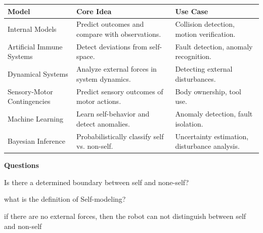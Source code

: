 \documentclass{book}
\providecommand{\ProjectDeepHeading}[2]{%
    \par\medskip\noindent\textbf{#2}\par\smallskip
}
\begin{document}
\begin{tabular}{|l|p{6cm}|p{5cm}|}
    \hline
    \textbf{Model}              & \textbf{Core Idea}                              & \textbf{Use Case}                             \\ \hline
    Internal Models             & Predict outcomes and compare with observations. & Collision detection, motion verification.     \\ \hline
    Artificial Immune Systems   & Detect deviations from self-space.              & Fault detection, anomaly recognition.         \\ \hline
    Dynamical Systems           & Analyze external forces in system dynamics.     & Detecting external disturbances.              \\ \hline
    Sensory-Motor Contingencies & Predict sensory outcomes of motor actions.      & Body ownership, tool use.                     \\ \hline
    Machine Learning            & Learn self-behavior and detect anomalies.       & Anomaly detection, fault isolation.           \\ \hline
    Bayesian Inference          & Probabilistically classify self vs. non-self.   & Uncertainty estimation, disturbance analysis. \\ \hline
\end{tabular}

\ProjectDeepHeading{1}{Questions}
Is there a determined boundary between self and none-self?

what is the definition of Self-modeling?

if there are no external forces, then the robot can not distinguish between self and non-self
\end{document}
